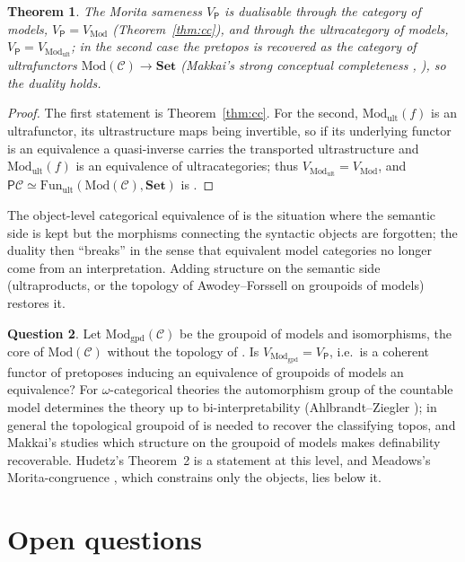\documentclass[11pt]{amsart}
\newtheorem{thm}{Theorem}[section]
\theoremstyle{definition}
\newtheorem{que}[thm]{Question}
\newcommand{\Mod}{\mathrm{Mod}}
\newcommand{\Set}{\mathbf{Set}}
\newcommand{\PP}{\mathsf P}
\newcommand{\cC}{\mathcal C}
\begin{document}
\begin{thm}\label{thm:duality}
The Morita sameness $V_\PP$ is dualisable through the category of
models, $V_\PP=V_{\Mod}$ (Theorem~\ref{thm:cc}), and through the
ultracategory of models, $V_\PP=V_{\Mod_{\mathrm{ult}}}$; in the second
case the pretopos is recovered as the category of ultrafunctors
$\Mod(\cC)\to\Set$ (Makkai's strong conceptual completeness
\cite{Makkai88}, \cite[Cor.~11]{LurieNotes}), so the duality holds.
\end{thm}
\begin{proof}
The first statement is Theorem~\ref{thm:cc}. For the second,
$\Mod_{\mathrm{ult}}(f)$ is an ultrafunctor, its ultrastructure maps
being invertible, so if its underlying functor is an equivalence a
quasi-inverse carries the transported ultrastructure and
$\Mod_{\mathrm{ult}}(f)$ is an equivalence of ultracategories; thus
$V_{\Mod_{\mathrm{ult}}}=V_{\Mod}$, and $\PP\cC\simeq\mathrm{Fun}_{\mathrm{ult}}(\Mod(\cC),\Set)$
is \cite{Makkai88}.
\end{proof}

The object-level categorical equivalence of \cite{BH16} is the
situation where the semantic side is kept but the morphisms connecting
the syntactic objects are forgotten; the duality then ``breaks'' in the
sense that equivalent model categories no longer come from an
interpretation. Adding structure on the semantic side (ultraproducts, or
the topology of Awodey--Forssell \cite{AF13} on groupoids of models)
restores it.

\begin{que}\label{que:groupoid}
Let $\Mod_{\mathrm{gpd}}(\cC)$ be the groupoid of models and
isomorphisms, the core of $\Mod(\cC)$ without the topology of
\cite{AF13}. Is $V_{\Mod_{\mathrm{gpd}}}=V_\PP$, i.e.\ is a coherent
functor of pretoposes inducing an equivalence of groupoids of models an
equivalence? For $\omega$-categorical theories the automorphism group of
the countable model determines the theory up to bi-interpretability
(Ahlbrandt--Ziegler \cite{AZ86}); in general the topological groupoid of
\cite{AF13} is needed to recover the classifying topos, and Makkai's
\cite{Makkai93} studies which structure on the groupoid of models makes
definability recoverable. Hudetz's Theorem~2 \cite{Hudetz19} is a
statement at this level, and Meadows's Morita-congruence
\cite[Def.~44]{Meadows24}, which constrains only the objects, lies
below it.
\end{que}

\section{Open questions}
\end{document}
